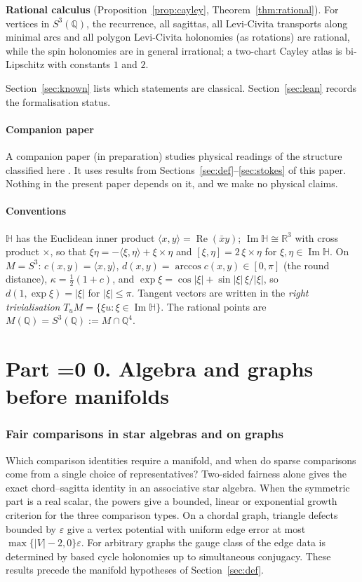 \documentclass[11pt,reqno]{amsart}
\theoremstyle{definition}
\theoremstyle{remark}
\numberwithin{equation}{section}
\newcommand{\R}{\mathbb{R}}
\newcommand{\HH}{\mathbb{H}}
\newcommand{\Q}{\mathbb{Q}}
\newcommand{\re}{\operatorname{Re}}
\newcommand{\im}{\operatorname{Im}}
\newcommand{\ip}[2]{\langle #1,#2\rangle}
\newcounter{ppart}
\renewcommand{\theppart}{\ifnum\value{ppart}=0 0\else\Roman{ppart}\fi}
\newcommand{\paperpart}[2]{\refstepcounter{ppart}\part*{Part \theppart. #2}\label{#1}}
\begin{document}
\noindent\textbf{Rational calculus} (Proposition~\ref{prop:cayley}, Theorem~\ref{thm:rational}).  For
vertices in $S^3(\Q)$, the recurrence, all sagittas, all Levi-Civita transports along minimal arcs and all
polygon Levi-Civita holonomies (as rotations) are rational, while the spin holonomies are in general irrational; a two-chart Cayley atlas is bi-Lipschitz with constants $1$ and $2$.

Section~\ref{sec:known} lists which statements are classical.  Section~\ref{sec:lean} records the
formalisation status.

\subsection{Companion paper}
A companion paper (in preparation) studies physical readings of the
structure classified here \cite{Companion}.  It uses results from Sections~\ref{sec:def}--\ref{sec:stokes} of this paper.  Nothing in the
present paper depends on it, and we make no physical claims.

\subsection{Conventions}
$\HH$ has the Euclidean inner product $\ip xy=\re(\bar xy)$; $\im\HH\cong\R^3$ with cross product
$\times$, so that $\xi\eta=-\ip\xi\eta+\xi\times\eta$ and $[\xi,\eta]=2\,\xi\times\eta$ for
$\xi,\eta\in\im\HH$.  On $M=S^3$: $c(x,y)=\ip xy$, $d(x,y)=\arccos c(x,y)\in[0,\pi]$ (the round
distance), $\kappa=\tfrac12(1+c)$, and $\exp\xi=\cos\lvert\xi\rvert+\sin\lvert\xi\rvert\,\xi/\lvert\xi\rvert$,
so $d(1,\exp\xi)=\lvert\xi\rvert$ for $\lvert\xi\rvert\le\pi$.  Tangent vectors are written in the
\emph{right trivialisation} $T_uM=\{\xi u:\xi\in\im\HH\}$.  The rational points are $M(\Q)=S^3(\Q):=M\cap\Q^4$.

\setcounter{ppart}{-1}
\paperpart{part:alg}{Algebra and graphs before manifolds}

\setcounter{section}{-1}
\section{Fair comparisons in star algebras and on graphs}
\label{sec:m1}\label{m1:section}

Which comparison identities require a manifold, and when do sparse comparisons
come from a single choice of representatives? Two-sided fairness alone gives
the exact chord--sagitta identity in an associative star algebra. When the
symmetric part is a real scalar, the powers give a bounded, linear or
exponential growth criterion for the three comparison types. On a chordal
graph, triangle defects bounded by \(\varepsilon\) give a vertex potential with
uniform edge error at most \(\max\{|V|-2,0\}\varepsilon\). For arbitrary graphs
the gauge class of the edge data is determined by based cycle holonomies up
to simultaneous conjugacy. These results precede the manifold hypotheses of
Section~\ref{sec:def}.
\end{document}
